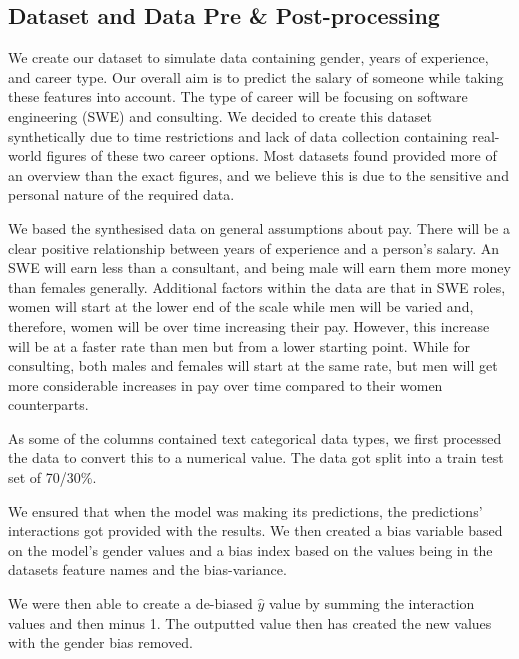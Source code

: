 \documentclass{sigchi}
\begin{document}
\subsection{Dataset and Data Pre \& Post-processing}
	We create our dataset to simulate data containing gender, years of experience, and career type. Our overall aim is to predict the salary of someone while taking these features into account. The type of career will be focusing on software engineering (SWE) and consulting.  We decided to create this dataset synthetically due to time restrictions and lack of data collection containing real-world figures of these two career options. Most datasets found provided more of an overview than the exact figures, and we believe this is due to the sensitive and personal nature of the required data.
	
	We based the synthesised data on general assumptions about pay. There will be a clear positive relationship between years of experience and a person's salary. An SWE will earn less than a consultant, and being male will earn them more money than females generally. Additional factors within the data are that in SWE roles, women will start at the lower end of the scale while men will be varied and, therefore, women will be over time increasing their pay. However, this increase will be at a faster rate than men but from a lower starting point. While for consulting, both males and females will start at the same rate, but men will get more considerable increases in pay over time compared to their women counterparts. 
	
	As some of the columns contained text categorical data types, we first processed the data to convert this to a numerical value. The data got split into a train test set of 70/30\%. 
	
	We ensured that when the model was making its predictions, the predictions' interactions got provided with the results. We then created a bias variable based on the model's gender values and a bias index based on the values being in the datasets feature names and the bias-variance. 
	
	We were then able to create a de-biased $\hat{y}$ value by summing the interaction values and then minus 1. The outputted value then has created the new values with the gender bias removed.


\end{document}
